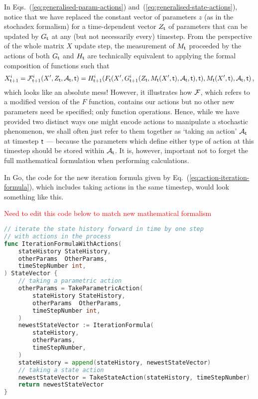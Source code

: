 In Eqs.~(\ref{eq:generalised-param-actions}) and~(\ref{eq:generalised-state-actions}), notice that we have replaced the constant vector of parameters $z$ (as in the stochadex formalism) for a time-dependent vector $Z_{{\sf t}}$ of parameters that can be updated by $G_{\sf t}$ at any (but not necessarily every) timestep. From the perspective of the whole matrix $X$ update step, the measurement of $M_{\sf t}$ proceeded by the actions of both $G_{\sf t}$ and $H_{\sf t}$ are technically equivalent to applying the formal composition of functions such that
\begin{align}
X^i_{{\sf t}+1} = {\cal F}^i_{{\sf t}+1}(X', Z_{{\sf t}}, {\cal A}_{\sf t}, {\sf t})=H^i_{{\sf t}+1}( F_{\sf t}(X', G_{{\sf t}+1}^i(Z_{{\sf t}}, M_{{\sf t}}(X', {\sf t}), {\cal A}_{{\sf t}}, {\sf t}), {\sf t}), M_{{\sf t}}(X', {\sf t}), {\cal A}_{{\sf t}}, {\sf t} ) \label{eq:action-iteration-formula}\,,
\end{align}
which looks like an absolute mess! However, it illustrates how ${\cal F}$, which refers to a modified version of the $F$ function, contains our actions but no other new parameters need be specified; only function operations. Hence, while we have provided two distinct ways one might encode actions to manipulate a stochastic phenomenon, we shall often just refer to them together as `taking an action' ${\cal A}_{\sf t}$ at timestep ${\sf t}$ --- because the parameters which define either type of action at this timestep should be stored within ${\cal A}_{\sf t}$. It is, however, important not to forget the full mathematical formulation when performing calculations. 

In Go, the code for the new iteration formula given by Eq.~(\ref{eq:action-iteration-formula}), which includes taking actions in the same timestep, would look something like this.

\textcolor{red}{Need to edit this code below to match new mathematical formalism}

\begin{lstlisting}[language=Go]
// iterate the state history forward in time by one step
// with actions in the process
func IterationFormulaWithActions(
    stateHistory StateHistory, 
    otherParams  OtherParams,
    timeStepNumber int,
) StateVector {
    // taking a parametric action
    otherParams = TakeParametricAction(
        stateHistory StateHistory, 
        otherParams  OtherParams,
        timeStepNumber int,
    )
    newestStateVector := IterationFormula(
        stateHistory, 
        otherParams,
        timeStepNumber,
    )
    stateHistory = append(stateHistory, newestStateVector)
    // taking a state action
    newestStateVector = TakeStateAction(stateHistory, timeStepNumber)
    return newestStateVector
}
\end{lstlisting}